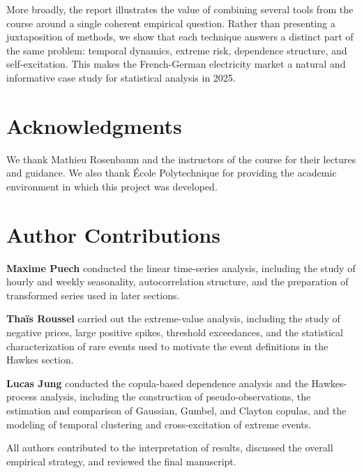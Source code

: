 \documentclass[11pt, a4paper]{article}
\theoremstyle{remark}
\begin{document}
More broadly, the report illustrates the value of combining several tools from the course around a single coherent empirical question. Rather than presenting a juxtaposition of methods, we show that each technique answers a distinct part of the same problem: temporal dynamics, extreme risk, dependence structure, and self-excitation. This makes the French-German electricity market a natural and informative case study for statistical analysis in 2025.

\section*{Acknowledgments}

We thank Mathieu Rosenbaum and the instructors of the course for their lectures and guidance. We also thank École Polytechnique for providing the academic environment in which this project was developed.

\section*{Author Contributions}

\textbf{Maxime Puech} conducted the linear time-series analysis, including the study of hourly and weekly seasonality, autocorrelation structure, and the preparation of transformed series used in later sections.

\textbf{Thaïs Roussel} carried out the extreme-value analysis, including the study of negative prices, large positive spikes, threshold exceedances, and the statistical characterization of rare events used to motivate the event definitions in the Hawkes section.

\textbf{Lucas Jung} conducted the copula-based dependence analysis and the Hawkes-process analysis, including the construction of pseudo-observations, the estimation and comparison of Gaussian, Gumbel, and Clayton copulas, and the modeling of temporal clustering and cross-excitation of extreme events.

All authors contributed to the interpretation of results, discussed the overall empirical strategy, and reviewed the final manuscript.



\end{document}
